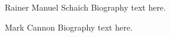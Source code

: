\documentclass[journal]{IEEEtran}
\theoremstyle{remark}
\theoremstyle{definition}
\begin{document}

% 

\begin{IEEEbiography}{Rainer Manuel Schaich}
Biography text here.
\end{IEEEbiography}

\begin{IEEEbiography}{Mark Cannon}
Biography text here.
\end{IEEEbiography}







\end{document}
